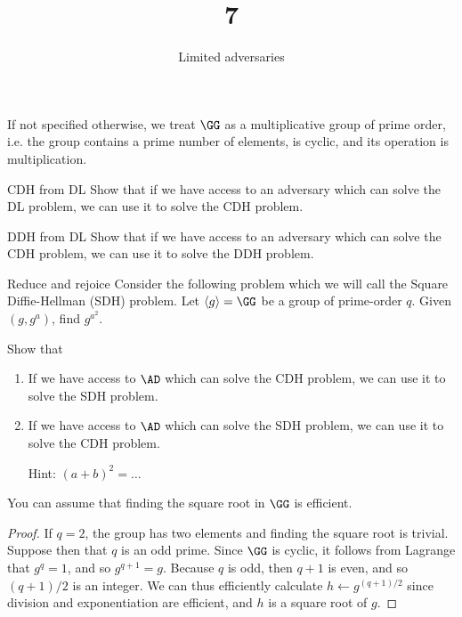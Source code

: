 \documentclass{practice}
\title{7}
\subtitle{Limited adversaries}
\date{\DTMdate{2024-10-23}}
\begin{document}
\maketitle

If not specified otherwise, we treat $\GG$ as a multiplicative group of prime order, i.e. the group contains a prime number of elements, is cyclic, and its operation is multiplication.

\begin{task}{CDH from DL}
  Show that if we have access to an adversary which can solve the DL problem, we can use it to solve the CDH problem.
\end{task}

\begin{task}{DDH from DL}
  Show that if we have access to an adversary which can solve the CDH problem, we can use it to solve the DDH problem.
\end{task}

\begin{task}{Reduce and rejoice}
  Consider the following problem which we will call the Square Diffie-Hellman (SDH) problem.
  Let $\langle g\rangle = \GG$ be a group of prime-order $q$.
  Given $(g, g^a)$, find $g^{a^2}$.

  Show that
  \begin{enumerate}
    \item If we have access to $\AD$ which can solve the CDH problem, we can use it to solve the SDH problem.
    \item If we have access to $\AD$ which can solve the SDH problem, we can use it to solve the CDH problem.
    
    Hint: $(a + b)^2 = \dots$
  \end{enumerate}

  You can assume that finding the square root in $\GG$ is efficient.

  \begin{proof}
    If $q = 2$, the group has two elements and finding the square root is trivial.
    Suppose then that $q$ is an odd prime.
    Since $\GG$ is cyclic, it follows from Lagrange that $g^q = 1$, and so $g^{q+1} = g$.
    Because $q$ is odd, then $q+1$ is even, and so $(q+1)/2$ is an integer.
    We can thus efficiently calculate $h \gets g^{(q+1)/2}$ since division and exponentiation are efficient, and $h$ is a square root of $g$.
  \end{proof}
\end{task}
\end{document}
